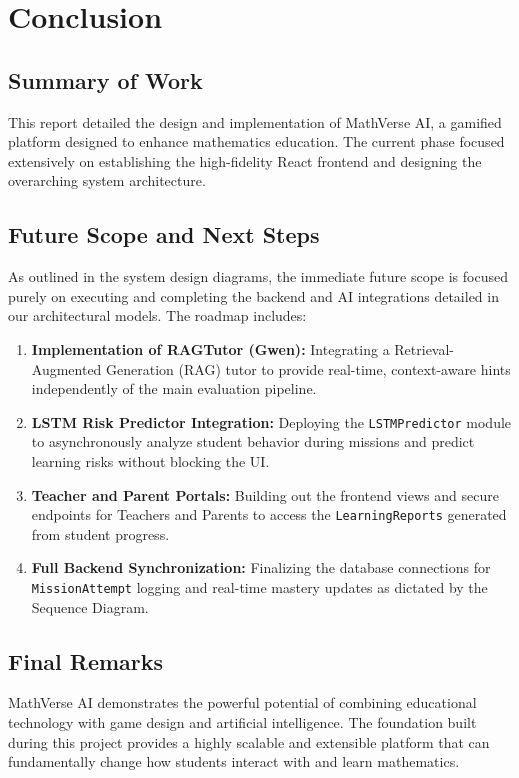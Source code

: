 \documentclass[12pt,a4paper]{report}
\begin{document}
\chapter{Conclusion}

\section{Summary of Work}
This report detailed the design and implementation of MathVerse AI, a gamified platform designed to enhance mathematics education. The current phase focused extensively on establishing the high-fidelity React frontend and designing the overarching system architecture.

\section{Future Scope and Next Steps}
As outlined in the system design diagrams, the immediate future scope is focused purely on executing and completing the backend and AI integrations detailed in our architectural models. The roadmap includes:
\begin{enumerate}
    \item \textbf{Implementation of RAGTutor (Gwen):} Integrating a Retrieval-Augmented Generation (RAG) tutor to provide real-time, context-aware hints independently of the main evaluation pipeline.
    \item \textbf{LSTM Risk Predictor Integration:} Deploying the \texttt{LSTMPredictor} module to asynchronously analyze student behavior during missions and predict learning risks without blocking the UI.
    \item \textbf{Teacher and Parent Portals:} Building out the frontend views and secure endpoints for Teachers and Parents to access the \texttt{LearningReports} generated from student progress.
    \item \textbf{Full Backend Synchronization:} Finalizing the database connections for \texttt{MissionAttempt} logging and real-time mastery updates as dictated by the Sequence Diagram.
\end{enumerate}

\section{Final Remarks}
MathVerse AI demonstrates the powerful potential of combining educational technology with game design and artificial intelligence. The foundation built during this project provides a highly scalable and extensible platform that can fundamentally change how students interact with and learn mathematics.
\end{document}
